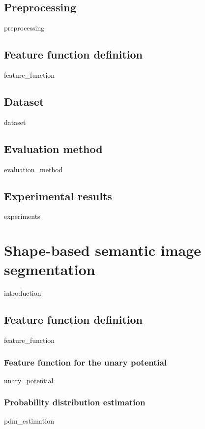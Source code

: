 \documentclass[12pt]{report}
\begin{document}
\section{Preprocessing}
\label{sec:linear_preprocessing}
{preprocessing}

\section{Feature function definition}	
{feature_function}

\section{Dataset}	
\label{sec:linear_dataset}
{dataset}

\section{Evaluation method}	
{evaluation_method}

\section{Experimental results}	
{experiments}




\chapter{Shape-based semantic image segmentation}
\label{chapter:nonlinear}
{introduction}

\section{Feature function definition}
{feature_function}

\subsection{Feature function for the unary potential}
\label{sec:nonlinear_unary_potential}
{unary_potential}

\subsection{Probability distribution estimation}
{pdm_estimation}
\end{document}
